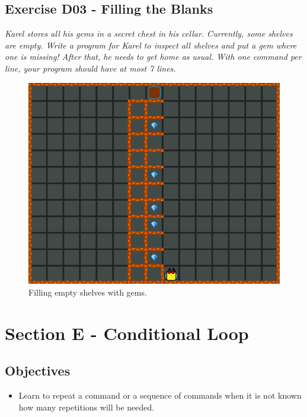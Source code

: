 {{{{\newpage




\subsection{Exercise D03 - Filling the Blanks}

{\em Karel stores all his gems in a secret chest in his cellar. 
Currently, some shelves are empty. Write a program for Karel to 
inspect all shelves and put a gem where one is missing! After that, he needs to get 
home as usual. With one 
command per line, your program should have at most 7 lines.}

\begin{figure}[!ht]
\begin{center}
\includegraphics[height=0.4\textwidth]{imgk/d03.png}
\end{center}
\vspace{-4mm}
\caption{Filling empty shelves with gems.}
\label{fig:d03}
\vspace{-4mm}
\end{figure}
\noindent


\section{Section E - Conditional Loop} \label{sec:whilek}

\subsection{Objectives} 
 
\begin{itemize}
\item Learn to repeat a command or a sequence of commands when it is not known 
      how many repetitions will be needed.
\end{itemize}

}}}}
